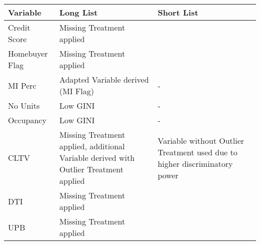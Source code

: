 \begin{longtable}{ l p{5.5cm} p{5.5cm} }\toprule    
\textbf{Variable}                    & \textbf{Long List}                                                                                                          & \textbf{Short List}                                                                                              \\\midrule
Credit Score                & \cellcolor[HTML]{B4EDB3}Missing Treatment applied                                                             & \cellcolor[HTML]{B4EDB3}                                                                           \\
Homebuyer Flag              & \cellcolor[HTML]{B4EDB3}Missing Treatment applied                                                             & \cellcolor[HTML]{B4EDB3}                                                                           \\
MI Perc                     & \cellcolor[HTML]{EDA8A0}Adapted Variable derived (MI Flag)                                                    & -                                                                                                  \\
No Units                    & \cellcolor[HTML]{EDA8A0}Low GINI                                                                              & -                                                                                                  \\
Occupancy                   & \cellcolor[HTML]{EDA8A0}Low GINI                                                                              & -                                                                                                  \\
CLTV                        & \cellcolor[HTML]{B4EDB3}Missing Treatment applied, additional Variable derived with Outlier Treatment applied & \cellcolor[HTML]{B4EDB3}Variable without Outlier Treatment used due to higher discriminatory power \\
DTI                         & \cellcolor[HTML]{B4EDB3}Missing Treatment applied                                                             & \cellcolor[HTML]{B4EDB3}                                                                           \\
UPB                         & \cellcolor[HTML]{B4EDB3}Missing Treatment applied                                                             & \cellcolor[HTML]{B4EDB3}                                                                           \\

\end{longtable}
